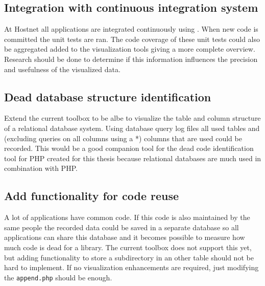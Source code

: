 \subsection*{Integration with continuous integration system}
At Hostnet all applications are integrated continuously\cite{fowler2006} using . When new code is committed the unit tests are ran. The code coverage of these unit tests could also be aggregated added to the visualization tools giving a more complete overview. Research should be done to determine if this information influences the precision and usefulness of the visualized data.

\subsection*{Dead database structure identification}
Extend the current toolbox to be albe to visualize the table and column structure of a relational database system. Using database query log files all used tables and (excluding queries on all columns using a *) columns that are used could be recorded. This would be a good companion tool for the dead code identification tool for PHP created for this thesis because relational databases are much used in combination with PHP.

\subsection*{Add functionality for code reuse}
A lot of applications have common code. If this code is also maintained by the same people the recorded data could be saved in a separate database so all applications can share this database and it becomes possible to measure how much code is dead for a library. The current toolbox does not support this yet, but adding functionality to store a subdirectory in an other table should not be hard to implement. If no visualization enhancements are required, just modifying the \verb|append.php| should be enough.